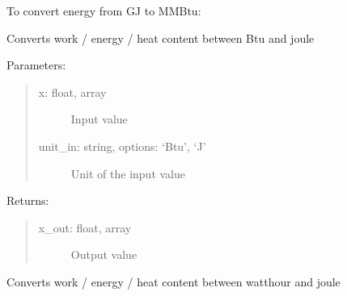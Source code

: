 \documentclass[letterpaper,10pt,english,openany]{sphinxmanual}
\begin{document}
\begin{fulllineitems}
To convert energy from GJ to MMBtu:

\begin{sphinxVerbatim}[commandchars=\\\{\}]
    
\end{sphinxVerbatim}

\begin{fulllineitems}
\label{\detokenize{source/mswh.tools:mswh.tools.unit_converters.UnitConv.Btu_J}}
Converts work / energy / heat content between Btu and joule

Parameters:
\begin{quote}
\begin{description}
\item[{x: float, array}] \leavevmode
Input value

\item[{unit\_in: string, options: ‘Btu’, ‘J’}] \leavevmode
Unit of the input value

\end{description}
\end{quote}

Returns:
\begin{quote}
\begin{description}
\item[{x\_out: float, array}] \leavevmode
Output value

\end{description}
\end{quote}

\end{fulllineitems}


\begin{fulllineitems}
\label{\detokenize{source/mswh.tools:mswh.tools.unit_converters.UnitConv.Wh_J}}
Converts work / energy / heat content between watthour and joule


\end{fulllineitems}
\end{fulllineitems}
\end{document}

